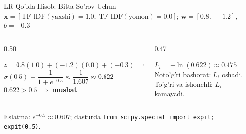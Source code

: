 \documentclass[aspectratio=169,11pt]{beamer}
\begin{document}
\begin{frame}{LR Qo'lda Hisob: Bitta So'rov Uchun}
  \small
  $\mathbf{x}=[\mathrm{TF\text{-}IDF(yaxshi)}{=}1.0,\;
  \mathrm{TF\text{-}IDF(yomon)}{=}0.0]$;\quad
  $\mathbf{w}=[0.8,\;{-}1.2]$,\; $b=-0.3$
  \vspace{5pt}
  \begin{columns}[T]
    \begin{column}{0.50\textwidth}
      \begin{tcolorbox}[defbox,title=Forward pass]
        \small
        $z = 0.8(1.0)+(-1.2)(0.0)+(-0.3) = 0.5$\\[5pt]
        $\sigma(0.5)=\dfrac{1}{1+e^{-0.5}}
        \approx\dfrac{1}{1.607}\approx 0.622$\\[5pt]
        $0.622>0.5$
        $\Rightarrow$ \textcolor{deepgreen}{\textbf{musbat}} \checkmark
      \end{tcolorbox}
    \end{column}
    \begin{column}{0.47\textwidth}
      \begin{tcolorbox}[defbox,title=Bitta namuna zarari ($y{=}1$)]
        \small
        $L_i = -\ln(0.622)\approx 0.475$\\[5pt]
        \textcolor{halfgray}{\footnotesize
          Noto'g'ri bashorat: $L_i$ oshadi.\\
          To'g'ri va ishonchli: $L_i$ kamayadi.}
      \end{tcolorbox}
    \end{column}
  \end{columns}
  \vspace{5pt}
  \textcolor{halfgray}{\footnotesize
    Eslatma: $e^{-0.5}\approx 0.607$;\quad
    dasturda \texttt{from scipy.special import expit; expit(0.5)}.}
\end{frame}
\end{document}
